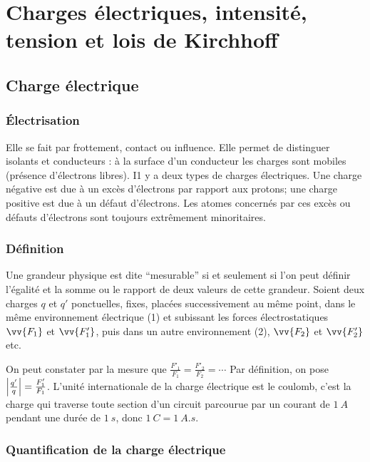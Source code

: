 \chapter{Charges électriques, intensité, tension et lois de Kirchhoff}%
\minitoc{}
\minilof{}
\minilot{}

\section{Charge électrique}%
\label{chap9-sec:chargeelectrique}%

\subsection{Électrisation}%
\label{chap9-subsec:electrisation}%

Elle se fait par frottement, contact ou influence. Elle permet de distinguer 
isolants et conducteurs : à la surface d'un conducteur les charges sont mobiles 
(présence d'électrons libres). I1 y a deux types de charges électriques. Une 
charge négative est due à un excès d'électrons par rapport aux protons; une 
charge positive est due à un défaut d'électrons. Les atomes concernés par ces 
excès ou défauts d'électrons sont toujours extrêmement minoritaires.

\subsection{Définition}%
\label{chap9-subsec:definition}%

Une grandeur physique est dite ``mesurable'' si et seulement si l'on peut 
définir l'égalité et la somme ou le rapport de deux valeurs de cette grandeur. 
Soient deux charges \(q\) et \(q'\) ponctuelles, fixes, placées successivement 
au même point, dans le même environnement électrique (1) et subissant les 
forces électrostatiques \(\vv{F_1}\) et \(\vv{F'_1}\), puis dans un autre 
environnement (2), \(\vv{F_2}\) et \(\vv{F'_2}\) etc.

On peut constater par la mesure que \(\frac{F'_1}{F_1} = \frac{F'_2}{F_2} = 
\dotsb\) Par définition, on pose \(\left\lvert\frac{q'}{q}\right\rvert = \frac{F'_1}{F_1}\).
L'unité internationale de la charge électrique est le coulomb, c'est la charge 
qui traverse toute section d'un circuit parcourue par un courant de 
\(\SI{1}{A}\) pendant une durée de \(\SI{1}{s}\), donc \(\SI{1}{C} = 
\SI{1}{A.s}\).

\subsection{Quantification de la charge électrique}%
\label{chap9-subsec:quantificationdelachargeelectrique}%

